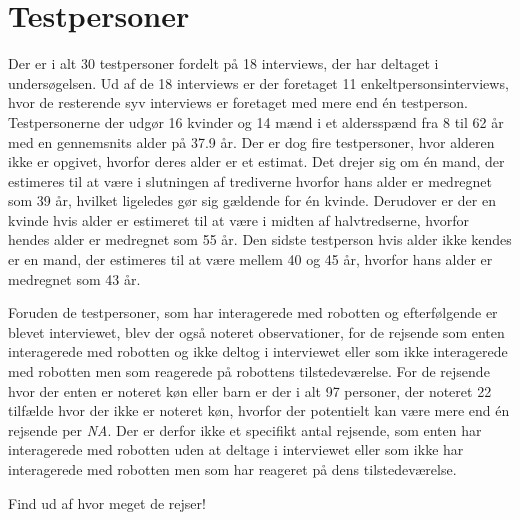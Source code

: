 \section{Testpersoner}
\label{ParametreTestpersoner}
%
Der er i alt 30 testpersoner fordelt på 18 interviews, der har deltaget i undersøgelsen. Ud af de 18 interviews er der foretaget 11 enkeltpersonsinterviews, hvor de resterende syv interviews er foretaget med mere end én testperson. Testpersonerne der udgør 16 kvinder og 14 mænd i et aldersspænd fra 8 til 62 år med en gennemsnits alder på 37.9 år. Der er dog fire testpersoner, hvor alderen ikke er opgivet, hvorfor deres alder er et estimat. Det drejer sig om én mand, der estimeres til at være i slutningen af trediverne hvorfor hans alder er medregnet som 39 år, hvilket ligeledes gør sig gældende for én kvinde. Derudover er der en kvinde hvis alder er estimeret til at være i midten af halvtredserne, hvorfor hendes alder er medregnet som 55 år. Den sidste testperson hvis alder ikke kendes er en mand, der estimeres til at være mellem 40 og 45 år, hvorfor hans alder er medregnet som 43 år. 

Foruden de testpersoner, som har interagerede med robotten og efterfølgende er blevet interviewet, blev der også noteret observationer, for de rejsende som enten interagerede med robotten og ikke deltog i interviewet eller som ikke interagerede med robotten men som reagerede på robottens tilstedeværelse. For de rejsende hvor der enten er noteret køn eller barn er der i alt 97 personer, der noteret 22 tilfælde hvor der ikke er noteret køn, hvorfor der potentielt kan være mere end én rejsende per \textit{NA}. Der er derfor ikke et specifikt antal rejsende, som enten har interagerede med robotten uden at deltage i interviewet eller som ikke har interagerede med robotten men som har reageret på dens tilstedeværelse. \blankline 


Find ud af hvor meget de rejser! 
